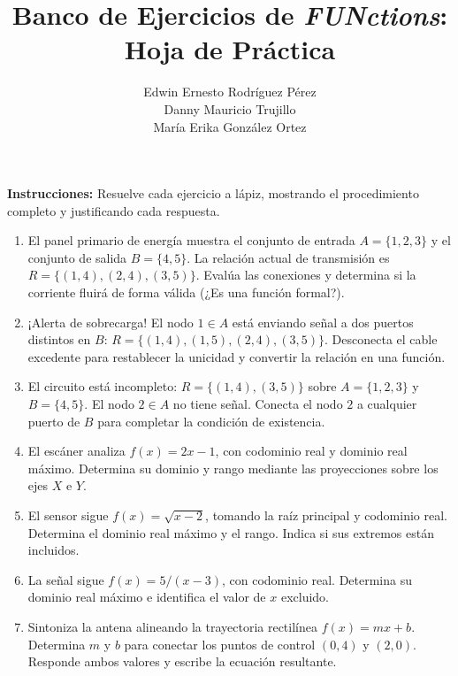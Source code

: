 \documentclass[12pt,a4paper]{article}
\title{Banco de Ejercicios de \textit{FUNctions}:\\ Hoja de Práctica}
\author{Edwin Ernesto Rodríguez Pérez\\ Danny Mauricio Trujillo\\ María Erika González Ortez}
\date{}
\begin{document}
\maketitle

\noindent\textbf{Instrucciones:} Resuelve cada ejercicio a lápiz, mostrando el procedimiento completo y justificando cada respuesta.

\vspace{1em}

\begin{enumerate}[label=\textbf{\arabic*.}, itemsep=2.5em]

\item El panel primario de energía muestra el conjunto de entrada $A=\{1, 2, 3\}$ y el conjunto de salida $B=\{4, 5\}$. La relación actual de transmisión es $R = \{(1,4), (2,4), (3,5)\}$. Evalúa las conexiones y determina si la corriente fluirá de forma válida (¿Es una función formal?).

\item ¡Alerta de sobrecarga! El nodo $1 \in A$ está enviando señal a dos puertos distintos en $B$: $R = \{(1,4), (1,5), (2,4), (3,5)\}$. Desconecta el cable excedente para restablecer la unicidad y convertir la relación en una función.

\item El circuito está incompleto: $R = \{(1,4), (3,5)\}$ sobre $A=\{1, 2, 3\}$ y $B=\{4, 5\}$. El nodo $2 \in A$ no tiene señal. Conecta el nodo $2$ a cualquier puerto de $B$ para completar la condición de existencia.

\item El escáner analiza $f(x) = 2x - 1$, con codominio real y dominio real máximo. Determina su dominio y rango mediante las proyecciones sobre los ejes $X$ e $Y$.

\item El sensor sigue $f(x)=\sqrt{x-2}$, tomando la raíz principal y codominio real. Determina el dominio real máximo y el rango. Indica si sus extremos están incluidos.

\item La señal sigue $f(x)=5/(x-3)$, con codominio real. Determina su dominio real máximo e identifica el valor de $x$ excluido.

\item Sintoniza la antena alineando la trayectoria rectilínea $f(x) = mx + b$. Determina $m$ y $b$ para conectar los puntos de control $(0,4)$ y $(2,0)$. Responde ambos valores y escribe la ecuación resultante.


\end{enumerate}
\end{document}
